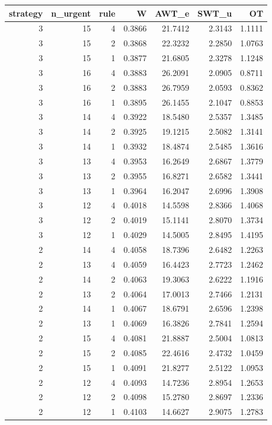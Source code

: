 \begin{tabular}{rrrrrrr}
\toprule
strategy & n_urgent & rule & W & AWT_e & SWT_u & OT \\
\midrule
3 & 15 & 4 & 0.3866 & 21.7412 & 2.3143 & 1.1111 \\
3 & 15 & 2 & 0.3868 & 22.3232 & 2.2850 & 1.0763 \\
3 & 15 & 1 & 0.3877 & 21.6805 & 2.3278 & 1.1248 \\
3 & 16 & 4 & 0.3883 & 26.2091 & 2.0905 & 0.8711 \\
3 & 16 & 2 & 0.3883 & 26.7959 & 2.0593 & 0.8362 \\
3 & 16 & 1 & 0.3895 & 26.1455 & 2.1047 & 0.8853 \\
3 & 14 & 4 & 0.3922 & 18.5480 & 2.5357 & 1.3485 \\
3 & 14 & 2 & 0.3925 & 19.1215 & 2.5082 & 1.3141 \\
3 & 14 & 1 & 0.3932 & 18.4874 & 2.5485 & 1.3616 \\
3 & 13 & 4 & 0.3953 & 16.2649 & 2.6867 & 1.3779 \\
3 & 13 & 2 & 0.3955 & 16.8271 & 2.6582 & 1.3441 \\
3 & 13 & 1 & 0.3964 & 16.2047 & 2.6996 & 1.3908 \\
3 & 12 & 4 & 0.4018 & 14.5598 & 2.8366 & 1.4068 \\
3 & 12 & 2 & 0.4019 & 15.1141 & 2.8070 & 1.3734 \\
3 & 12 & 1 & 0.4029 & 14.5005 & 2.8495 & 1.4195 \\
2 & 14 & 4 & 0.4058 & 18.7396 & 2.6482 & 1.2263 \\
2 & 13 & 4 & 0.4059 & 16.4423 & 2.7723 & 1.2462 \\
2 & 14 & 2 & 0.4063 & 19.3063 & 2.6222 & 1.1916 \\
2 & 13 & 2 & 0.4064 & 17.0013 & 2.7466 & 1.2131 \\
2 & 14 & 1 & 0.4067 & 18.6791 & 2.6596 & 1.2398 \\
2 & 13 & 1 & 0.4069 & 16.3826 & 2.7841 & 1.2594 \\
2 & 15 & 4 & 0.4081 & 21.8887 & 2.5004 & 1.0813 \\
2 & 15 & 2 & 0.4085 & 22.4616 & 2.4732 & 1.0459 \\
2 & 15 & 1 & 0.4091 & 21.8277 & 2.5122 & 1.0953 \\
2 & 12 & 4 & 0.4093 & 14.7236 & 2.8954 & 1.2653 \\
2 & 12 & 2 & 0.4098 & 15.2780 & 2.8697 & 1.2336 \\
2 & 12 & 1 & 0.4103 & 14.6627 & 2.9075 & 1.2783 \\

\end{tabular}
